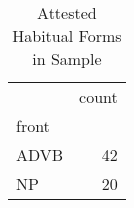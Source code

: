 \begin{table}[htbp!]
\centering
\caption{Attested Habitual Forms in Sample}
\label{table:hab_phtype}
\begin{tabular}{lr}
\toprule
{} &  count \\
front &        \\
\midrule
ADVB  &     42 \\
NP    &     20 \\
\bottomrule
\end{tabular}
\end{table}
